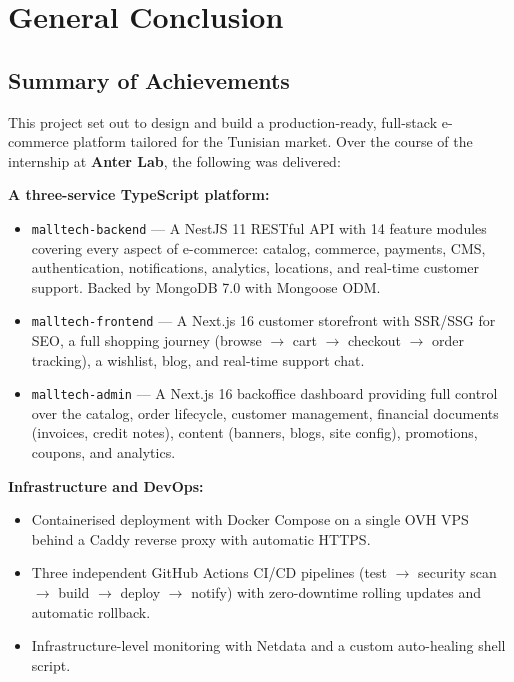 
\chapter*{General Conclusion}

\section*{Summary of Achievements}

This project set out to design and build a production-ready, full-stack e-commerce
platform tailored for the Tunisian market. Over the course of the internship at
\textbf{Anter Lab}, the following was delivered:

\textbf{A three-service TypeScript platform:}
\begin{itemize}
    \item \texttt{malltech-backend} --- A NestJS 11 RESTful API with 14 feature modules covering every aspect of e-commerce: catalog, commerce, payments, CMS, authentication, notifications, analytics, locations, and real-time customer support. Backed by MongoDB 7.0 with Mongoose ODM.
    \item \texttt{malltech-frontend} --- A Next.js 16 customer storefront with SSR/SSG for SEO, a full shopping journey (browse $\rightarrow$ cart $\rightarrow$ checkout $\rightarrow$ order tracking), a wishlist, blog, and real-time support chat.
    \item \texttt{malltech-admin} --- A Next.js 16 backoffice dashboard providing full control over the catalog, order lifecycle, customer management, financial documents (invoices, credit notes), content (banners, blogs, site config), promotions, coupons, and analytics.
\end{itemize}

\textbf{Infrastructure and DevOps:}
\begin{itemize}
    \item Containerised deployment with Docker Compose on a single OVH VPS behind a Caddy reverse proxy with automatic HTTPS.
    \item Three independent GitHub Actions CI/CD pipelines (test $\rightarrow$ security scan $\rightarrow$ build $\rightarrow$ deploy $\rightarrow$ notify) with zero-downtime rolling updates and automatic rollback.
    \item Infrastructure-level monitoring with Netdata and a custom auto-healing shell script.
\end{itemize}

